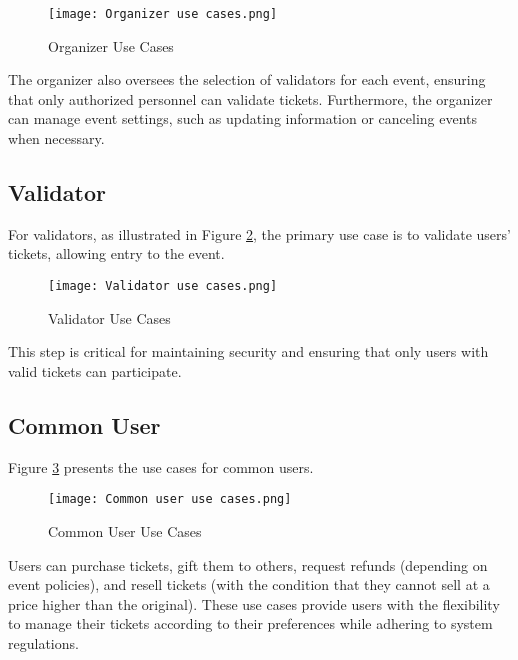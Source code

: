 \begin{figure}[H]
    \centering
    \texttt{[image: Organizer use cases.png]}
    \caption{Organizer Use Cases}
    \label{fig:organizer_use_cases}
\end{figure}

The organizer also oversees the selection of validators for each event,
ensuring that only authorized personnel can validate tickets. Furthermore, the
organizer can manage event settings, such as updating information or canceling
events when necessary.

\subsection{Validator}
\label{subsec:validator}

For validators, as illustrated in Figure \ref{fig:validator_use_cases}, the
primary use case is to validate users' tickets, allowing entry to the event.

\begin{figure}[H]
    \centering
    \texttt{[image: Validator use cases.png]}
    \caption{Validator Use Cases}
    \label{fig:validator_use_cases}
\end{figure}

This step is critical for maintaining security and ensuring that only users
with valid tickets can participate.

\subsection{Common User}
\label{subsec:common_user}

Figure \ref{fig:common_user_use_cases} presents the use cases for common users.

\begin{figure}[H]
    \centering
    \texttt{[image: Common user use cases.png]}
    \caption{Common User Use Cases}
    \label{fig:common_user_use_cases}
\end{figure}

Users can purchase tickets, gift them to others, request refunds (depending on
event policies), and resell tickets (with the condition that they cannot sell
at a price higher than the original). These use cases provide users with the
flexibility to manage their tickets according to their preferences while
adhering to system regulations.
